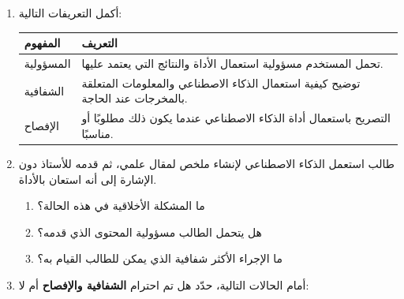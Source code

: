 \documentclass[a4paper]{article}
\begin{document}
\begin{enumerate}


\item أكمل التعريفات التالية:

\begin{center}

\begin{tabular}{|
>{\raggedleft\arraybackslash}m{4.5cm}|
>{\raggedleft\arraybackslash}m{9.5cm}|}

\hline

\textbf{المفهوم} & \textbf{التعريف} \\

\hline

المسؤولية
&
تحمل المستخدم مسؤولية استعمال الأداة والنتائج التي يعتمد
عليها.
\\
\hline

الشفافية
&
توضيح كيفية استعمال الذكاء الاصطناعي والمعلومات المتعلقة
بالمخرجات عند الحاجة.
\\
\hline

الإفصاح
&
التصريح باستعمال أداة الذكاء الاصطناعي عندما يكون ذلك
مطلوبًا أو مناسبًا.
\\
\hline

\end{tabular}

\end{center}


\item طالب استعمل الذكاء الاصطناعي لإنشاء ملخص لمقال علمي،
ثم قدمه للأستاذ دون الإشارة إلى أنه استعان بالأداة.

\begin{enumerate}

    \item ما المشكلة الأخلاقية في هذه الحالة؟
    
    \item هل يتحمل الطالب مسؤولية المحتوى الذي قدمه؟
    
    \item ما الإجراء الأكثر شفافية الذي يمكن للطالب القيام به؟

\end{enumerate}


\item أمام الحالات التالية، حدّد هل تم احترام
\textbf{الشفافية والإفصاح} أم لا:


\end{enumerate}
\end{document}
